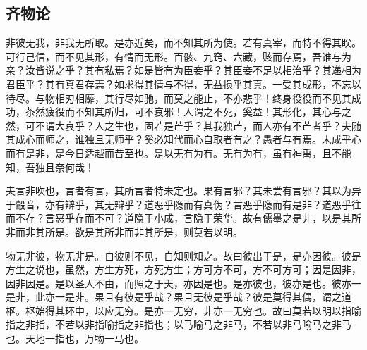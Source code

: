         \subsection{齐物论}
            非彼无我，非我无所取。是亦近矣，而不知其所为使。若有真宰，而特不得其眹。可行己信，而不见其形，有情而无形。百骸、九窍、六藏，赅而存焉，吾谁与为亲？汝皆说之乎？其有私焉？如是皆有为臣妾乎？其臣妾不足以相治乎？其递相为君臣乎？其有真君存焉？如求得其情与不得，无益损乎其真。一受其成形，不忘以待尽。与物相刃相靡，其行尽如驰，而莫之能止，不亦悲乎！终身役役而不见其成功，苶然疲役而不知其所归，可不哀邪！人谓之不死，奚益！其形化，其心与之然，可不谓大哀乎？人之生也，固若是芒乎？其我独芒，而人亦有不芒者乎？夫随其成心而师之，谁独且无师乎？奚必知代而心自取者有之？愚者与有焉。未成乎心而有是非，是今日适越而昔至也。是以无有为有。无有为有，虽有神禹，且不能知，吾独且奈何哉！

            夫言非吹也，言者有言，其所言者特未定也。果有言邪？其未尝有言邪？其以为异于鷇音，亦有辩乎，其无辩乎？道恶乎隐而有真伪？言恶乎隐而有是非？道恶乎往而不存？言恶乎存而不可？道隐于小成，言隐于荣华。故有儒墨之是非，以是其所非而非其所是。欲是其所非而非其所是，则莫若以明。

            物无非彼，物无非是。自彼则不见，自知则知之。故曰彼出于是，是亦因彼。彼是方生之说也，虽然，方生方死，方死方生；方可方不可，方不可方可；因是因非，因非因是。是以圣人不由，而照之于天，亦因是也。是亦彼也，彼亦是也。彼亦一是非，此亦一是非。果且有彼是乎哉？果且无彼是乎哉？彼是莫得其偶，谓之道枢。枢始得其环中，以应无穷。是亦一无穷，非亦一无穷也。故曰莫若以明以指喻指之非指，不若以非指喻指之非指也；以马喻马之非马，不若以非马喻马之非马也。天地一指也，万物一马也。
